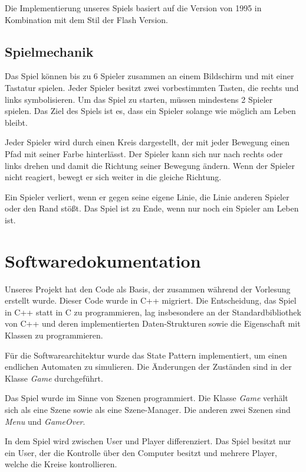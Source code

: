 \documentclass[doktyp=studarbeit]{TUBAFarbeiten}
\begin{document}
Die Implementierung unseres Spiels basiert auf die Version von 1995 in 
Kombination mit dem Stil der Flash Version.

\subsection{Spielmechanik}

Das Spiel können bis zu 6 Spieler zusammen an einem Bildschirm und mit einer 
Tastatur spielen. Jeder Spieler besitzt zwei vorbestimmten Tasten, die rechts 
und links symbolisieren. Um das Spiel zu starten, müssen mindestens 
2 Spieler spielen. Das Ziel des Spiels ist es, dass ein Spieler solange wie
möglich am Leben bleibt.

Jeder Spieler wird durch einen Kreis dargestellt, der mit jeder Bewegung einen 
Pfad mit seiner Farbe hinterlässt. Der Spieler kann sich nur nach
rechts oder links drehen und damit die Richtung seiner Bewegung ändern. Wenn
der Spieler nicht reagiert, bewegt er sich weiter in die gleiche Richtung.

Ein Spieler verliert, wenn er gegen seine eigene Linie, die Linie anderen 
Spieler oder den Rand stößt. Das Spiel ist zu Ende, wenn nur noch ein 
Spieler am Leben ist.

\section{Softwaredokumentation}

Unseres Projekt hat den Code als Basis, der zusammen während der Vorlesung 
erstellt wurde. Dieser Code wurde in C++ migriert. 
Die Entscheidung, das Spiel in C++ statt in C zu programmieren, lag 
insbesondere an der Standardbibliothek von C++ und deren implementierten 
Daten-Strukturen sowie die Eigenschaft mit Klassen zu programmieren.

Für die Softwarearchitektur wurde das State Pattern implementiert, um einen 
endlichen Automaten zu simulieren. Die Änderungen der Zuständen sind in der 
Klasse \textit{Game} durchgeführt.

Das Spiel wurde im Sinne von Szenen programmiert. Die Klasse \textit{Game}
verhält sich als eine Szene sowie als eine Szene-Manager. Die anderen
zwei Szenen sind \textit{Menu} und \textit{GameOver}.

In dem Spiel wird zwischen User und Player differenziert. Das Spiel besitzt nur
ein User, der die Kontrolle über den Computer besitzt und mehrere Player, 
welche die Kreise kontrollieren.
\end{document}
